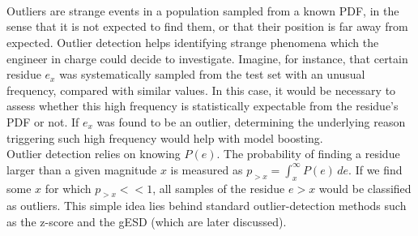 \paragraph{ \label{par:outliers}\\}
Outliers are strange events in a population sampled from a known PDF, in the sense that it is not expected to find them, or that their position is far away from expected. Outlier detection helps identifying strange phenomena which the engineer in charge could decide to investigate. Imagine, for instance, that certain residue $e_x$ was systematically sampled from the test set with an unusual frequency, compared with similar values. In this case, it would be necessary to assess whether this high frequency is statistically expectable from the residue's PDF or not. If $e_x$  was found to be an outlier, determining the underlying reason triggering such high frequency would help with model boosting.\\
\indent Outlier detection relies on knowing $P(e)$. The probability of finding a residue larger than a given magnitude $x$ is measured as $p_{>x}=\int_{x}^{\infty} P(e) \, de$. If we find some $x$ for which $p_{>x}<<1$, all samples of the residue $e>x$ would be classified as outliers. This simple idea lies behind standard outlier-detection methods such as the z-score and the gESD (which are later discussed).
